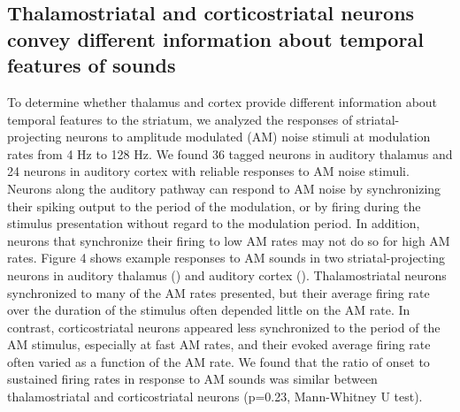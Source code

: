 \subsection{Thalamostriatal and corticostriatal neurons convey different information about temporal features of sounds}

To determine whether thalamus and cortex provide different information about temporal features to the striatum, we analyzed the responses of striatal-projecting neurons to amplitude modulated (AM) noise stimuli at modulation rates from 4 Hz to 128 Hz.
%
We found 36 tagged neurons in auditory thalamus and 24 neurons in auditory cortex with reliable responses to AM noise stimuli.
%
Neurons along the auditory pathway can respond to AM noise by synchronizing their spiking output to the period of the modulation, or by firing during the stimulus presentation without regard to the modulation period.
%
In addition, neurons that synchronize their firing to low AM rates may not do so for high AM rates.
%
Figure 4 shows example responses to AM sounds in two striatal-projecting neurons in auditory thalamus (\fig{\AMThalExamples}) and auditory cortex (\fig{\AMACExamples}).
%
Thalamostriatal neurons synchronized to many of the AM rates presented, but their average firing rate over the duration of the stimulus often depended little on the AM rate.
%
In contrast, corticostriatal neurons appeared less synchronized to the period of the AM stimulus, especially at fast AM rates, and their evoked average firing rate often varied as a function of the AM rate.
%
We found that the ratio of onset to sustained firing rates in response to AM sounds was similar between thalamostriatal and corticostriatal neurons (p=0.23, Mann-Whitney U test).

